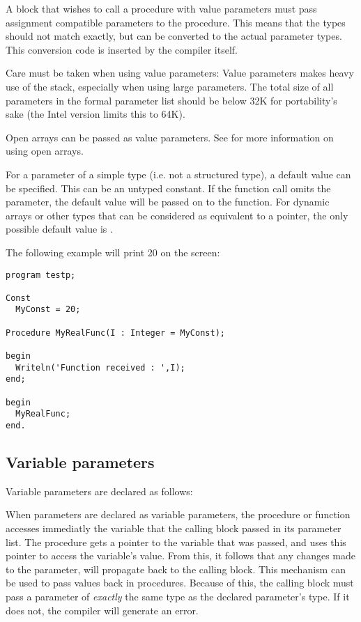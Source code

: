 A block that wishes to call a procedure with value parameters must pass
assignment compatible parameters to the procedure. This means that the types
should not match exactly, but can be converted to the actual parameter
types. This conversion code is inserted by the compiler itself.

Care must be taken when using value parameters: Value parameters makes heavy
use of the stack, especially when using large parameters. The total size of
all parameters in the formal parameter list should be below 32K for
portability's sake (the Intel version limits this to 64K).

Open arrays can be passed as value parameters. See  for
more information on using open arrays.

For a parameter of a  simple type (i.e. not a structured type), a default
value can be specified. This can be an untyped constant. If the function
call omits the parameter, the default value will be passed on to the
function. For dynamic arrays or other types that can be considered as
equivalent to a pointer, the only possible default value is .

The following example will print 20 on the screen:
\begin{verbatim}
program testp;

Const
  MyConst = 20;

Procedure MyRealFunc(I : Integer = MyConst);

begin
  Writeln('Function received : ',I);
end;  
  
begin
  MyRealFunc;
end.    
\end{verbatim}

\subsection{Variable parameters}
\label{se:varparams}
Variable parameters are declared as follows:

When parameters are declared as variable parameters, the procedure or
function accesses immediatly the variable that the calling block passed in
its parameter list. The procedure gets a pointer to the variable that was
passed, and uses this pointer to access the variable's value.
From this, it follows that any changes made to the parameter, will
propagate back to the calling block. This mechanism can be used to pass
values back in procedures.
Because of this, the calling block must pass a parameter of {\em exactly}
the same type as the declared parameter's type. If it does not, the compiler
will generate an error.


